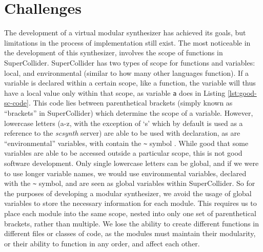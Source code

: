 \section{Challenges}\label{section:limitations}

The development of a virtual modular synthesizer has achieved its goals, but limitations in the process of implementation still exist. The most noticeable in the development of this synthesizer, involves the scope of functions in SuperCollider. SuperCollider has two types of scope for functions and variables: local, and environmental (similar to how many other languages function). If a variable is declared within a certain scope, like a function, the variable will thus have a local value only within that scope, as variable \texttt{a} does in Listing \ref{lst:good-sc-code}. This code lies between parenthetical brackets (simply known as ``brackets'' in SuperCollider) which determine the scope of a variable. However, lowercase letters (a-z, with the exception of `s' which by default is used as a reference to the \textit{scsynth} server) are able to be used with declaration, as are ``environmental'' variables, with contain the \texttt{\~} symbol \cite{McCartney_2016}. While good that some variables are able to be accessed outside a particular scope, this is not good software development. Only single lowercase letters can be global, and if we were to use longer variable names, we would use environmental variables, declared with the \texttt{\~} symbol, and are seen as global variables within SuperCollider. So for the purposes of developing a modular synthesizer, we avoid the usage of global variables to store the necessary information for each module. This requires us to place each module into the same scope, nested into only one set of parenthetical brackets, rather than multiple. We lose the ability to create different functions in different files or classes of code, as the modules must maintain their modularity, or their ability to function in any order, and affect each other.